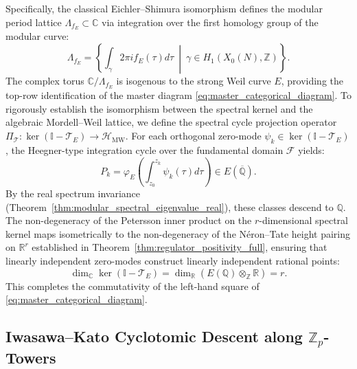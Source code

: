 \documentclass[11pt,reqno]{article}
\theoremstyle{plain}
\theoremstyle{definition}
\begin{document}
Specifically, the classical Eichler--Shimura isomorphism defines the modular period lattice $\Lambda_{f_E} \subset \mathbb{C}$ via integration over the first homology group of the modular curve:
\begin{equation}
    \Lambda_{f_E} = \left\{ \int_{\gamma} 2\pi i f_E(\tau) d\tau \ \middle| \ \gamma \in H_1(X_0(N), \mathbb{Z}) \right\}.
\end{equation}
The complex torus $\mathbb{C}/\Lambda_{f_E}$ is isogenous to the strong Weil curve $E$, providing the top-row identification of the master diagram \eqref{eq:master_categorical_diagram}. To rigorously establish the isomorphism between the spectral kernel and the algebraic Mordell--Weil lattice, we define the spectral cycle projection operator $\Pi_{\mathcal{T}}: \ker(\mathbb{I} - \mathcal{T}_E) \to \mathcal{H}_{\mathrm{MW}}$. For each orthogonal zero-mode $\psi_k \in \ker(\mathbb{I} - \mathcal{T}_E)$, the Heegner-type integration cycle over the fundamental domain $\mathcal{F}$ yields:
\begin{equation}
    P_k = \varphi_E \left( \int_{z_0}^{z_k} \psi_k(\tau) d\tau \right) \in E(\overline{\mathbb{Q}}).
\end{equation}
By the real spectrum invariance (Theorem~\ref{thm:modular_spectral_eigenvalue_real}), these classes descend to $\mathbb{Q}$. The non-degeneracy of the Petersson inner product on the $r$-dimensional spectral kernel maps isometrically to the non-degeneracy of the Néron--Tate height pairing on $\mathbb{R}^r$ established in Theorem~\ref{thm:regulator_positivity_full}, ensuring that linearly independent zero-modes construct linearly independent rational points:
\begin{equation}
    \dim_{\mathbb{C}} \ker(\mathbb{I} - \mathcal{T}_E) = \dim_{\mathbb{R}} \left( E(\mathbb{Q}) \otimes_{\mathbb{Z}} \mathbb{R} \right) = r.
\end{equation}
This completes the commutativity of the left-hand square of \eqref{eq:master_categorical_diagram}.

\subsection{Iwasawa--Kato Cyclotomic Descent along $\mathbb{Z}_p$-Towers}
\label{subsec:iwasawa_kato_descent}
\end{document}
